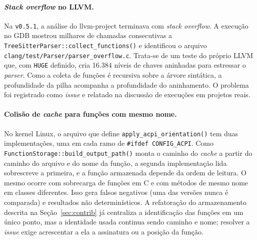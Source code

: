 \documentclass{article}
\newcommand{\cpp}{C\nolinebreak\hspace{-.05em}\raisebox{.4ex}{\relsize{-3}{\textbf{+}}}\nolinebreak\hspace{-.10em}\raisebox{.4ex}{\relsize{-3}{\textbf{+}}}}
\begin{document}
\paragraph{\emph{Stack overflow} no \textsc{LLVM}.}
Na \texttt{v0.5.1}, a análise do llvm-project terminava com \emph{stack overflow}. A execução no GDB mostrou milhares de chamadas consecutivas a \texttt{TreeSitterParser::\allowbreak collect\_functions()} e identificou o arquivo \texttt{clang/\allowbreak test/\allowbreak Parser/\allowbreak parser\_overflow.c}. Trata-se de um teste do próprio \textsc{LLVM} que, com \texttt{HUGE} definido, cria 16.384 níveis de chaves aninhadas para estressar o \emph{parser}. Como a coleta de funções é recursiva sobre a árvore sintática, a profundidade da pilha acompanha a profundidade do aninhamento. O problema foi registrado como \textit{issue} e relatado na discussão de execuções em projetos reais.

\paragraph{Colisão de \textit{cache} para funções com mesmo nome.}
No kernel Linux, o arquivo que define \texttt{apply\_acpi\_orientation()} tem duas implementações, uma em cada ramo de \texttt{\#ifdef CONFIG\_ACPI}. Como \texttt{FunctionStorage::\allowbreak build\allowbreak\_output\allowbreak\_path()} monta o caminho do \textit{cache} a partir do caminho do arquivo e do nome da função, a segunda implementação lida sobrescreve a primeira, e a função armazenada depende da ordem de leitura. O mesmo ocorre com sobrecarga de funções em \cpp{} e com métodos de mesmo nome em classes diferentes. Isso gera falsos negativos (uma das versões nunca é comparada) e resultados não determinísticos. A refatoração do armazenamento descrita na Seção~\ref{sec:contrib} já centraliza a identificação das funções em um único ponto, mas a identidade usada continua sendo caminho e nome; resolver a \textit{issue} exige acrescentar a ela a assinatura ou a posição da função.
\end{document}
